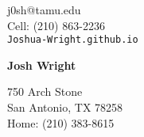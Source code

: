 \documentclass[12pt]{article}
\begin{document}

\noindent
\begin{minipage}{0.3\linewidth}
\begin{flushleft}
j0sh@tamu.edu\\
Cell: (210) 863-2236\\
\verb|Joshua-Wright.github.io|
\end{flushleft}
\end{minipage}
\hfill
\begin{minipage}{0.3\linewidth}
\begin{center}
{\Huge\textbf{Josh Wright}}
\end{center}
\end{minipage}
\hfill
\begin{minipage}{0.3\linewidth}
\begin{flushright}
750 Arch Stone\\
San Antonio, TX 78258 \\
Home: (210) 383-8615
\end{flushright}
\end{minipage}
\vspace{-4px}
\end{document}
